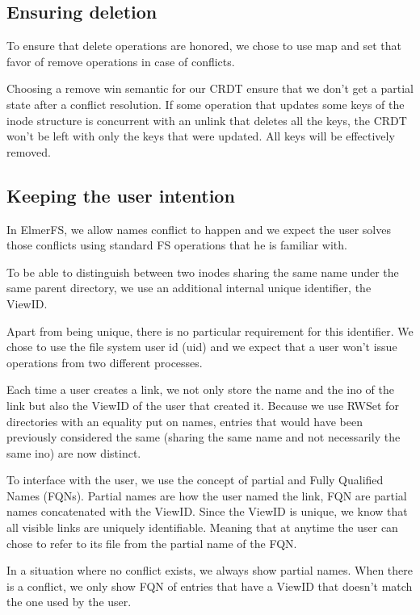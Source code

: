 \documentclass[sigconf,anonymous,10pt]{acmart}
\begin{document}
\subsection{Ensuring deletion}

\label{sec:deletion}
To ensure that delete operations are honored, we chose to use map and set that
favor of remove operations in case of conflicts.

Choosing a remove win semantic for our CRDT ensure that we don't get a partial
state after a conflict resolution. If some operation that updates some keys of the
inode structure is concurrent with an unlink that deletes all the keys, the
CRDT won't be left with only the keys that were updated.
All keys will be effectively removed.

\subsection{Keeping the user intention}

In ElmerFS, we allow names conflict to happen and we expect the user solves
those conflicts using standard FS operations that he is familiar with.

To be able to distinguish between two inodes sharing the same name under
the same parent directory, we use an additional internal unique identifier,
the ViewID.

Apart from being unique, there is no particular requirement for this identifier.
We chose to use the file system user id (uid) and we expect that a
user won’t issue operations from two different processes.

Each time a user creates a link, we not only store the name and the ino
of the link but also the ViewID of the user that created it.
Because we use RWSet for directories with an equality put on names,
entries that would have been previously considered the same
(sharing the same name and not necessarily the same ino) are now distinct.

To interface with the user, we use the concept of partial and
Fully Qualified Names (FQNs).
Partial names are how the user named the link,
FQN are partial names concatenated with the ViewID.
Since the ViewID is unique, we know that all visible links are uniquely
identifiable. Meaning that at anytime the user can chose to refer to its file
from the partial name of the FQN.

In a situation where no conflict exists, we always show partial names.
When there is a conflict, we only show FQN of entries that have a ViewID that
doesn’t match the one used by the user.
\end{document}
